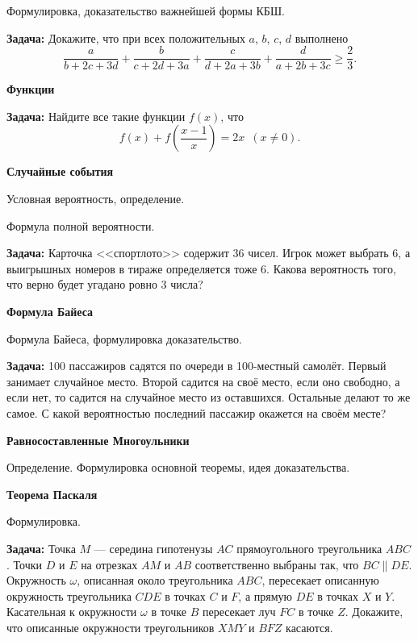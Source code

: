 \documentclass{article}
\begin{document}
\begin{enumerate_boxed}
        Формулировка, доказательство важнейшей формы КБШ.

        \textbf{Задача:} Докажите, что при всех положительных $a$, $b$, $c$, $d$ выполнено
        \[
        \frac{a}{b+2c+3d} + \frac{b}{c+2d+3a} + \frac{c}{d+2a+3b} +
        \frac{d}{a+2b+3c} \geqslant \frac{2}{3}.
        \]

        \item \textbf{Функции}

        \textbf{Задача:} Найдите все такие функции $f(x)$, что \[f(x) + f\left(\frac{x - 1}{x}\right) = 2x \,\,\, (x \neq  0).\]

        \item \textbf{Случайные события}

        Условная вероятность, определение.

        Формула полной вероятности.

        \textbf{Задача:} Карточка <<спортлото>> содержит 36 чисел.
        Игрок может выбрать 6, а выигрышных номеров в тираже определяется тоже 6.
        Какова вероятность того, что верно будет угадано ровно 3 числа?

        \item \textbf{Формула Байеса}

        Формула Байеса, формулировка доказательство.

        \textbf{Задача:} 100 пассажиров садятся по очереди в 100-местный самолёт.
        Первый занимает случайное место.
        Второй садится на своё место, если оно свободно, а если нет, то садится на случайное место из оставшихся.
        Остальные делают то же самое.
        С какой вероятностью последний пассажир окажется на своём месте?


        \item \textbf{Равносоставленные Многоульники}

        Определение.
        Формулировка основной теоремы, идея доказательства.

        \item \textbf{Теорема Паскаля}

        Формулировка.

        \textbf{Задача:} Точка $M$ — середина гипотенузы $AC$ прямоугольного треугольника $ABC$.
        Точки $D$ и $E$ на отрезках $AM$ и $AB$ соответственно выбраны так, что $BC \parallel DE$.
        Окружность $\omega$, описанная около треугольника $ABC$, пересекает описанную окружность треугольника $CDE$ в точках $C$ и $F$, а прямую $DE$ в точках $X$ и $Y$.
        Касательная к окружности $\omega$ в точке $B$ пересекает луч $FC$ в точке $Z$.
        Докажите, что описанные окружности треугольников $XMY$ и $BFZ$ касаются.


\end{enumerate_boxed}
\end{document}
